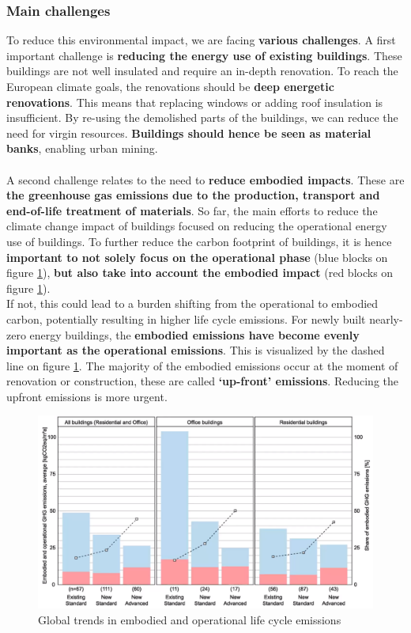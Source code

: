 \documentclass[../summary.tex]{subfiles}
\begin{document}
	\subsubsection{Main challenges}
	
	To reduce this environmental impact, we are facing \textbf{various challenges}. A first important challenge is \textbf{reducing the energy use of existing buildings}. These buildings are not well insulated and require an in-depth renovation. To reach the European climate goals, the renovations should be \textbf{deep energetic renovations}. This means that replacing windows or adding roof insulation is insufficient. By re-using the demolished parts of the buildings, we can reduce the need for virgin resources. \textbf{Buildings should hence be seen as material banks}, enabling urban mining.
	\\\\
	A second challenge relates to the need to \textbf{reduce embodied impacts}. These are \textbf{the greenhouse gas emissions due to the production, transport and end-of-life treatment of materials}. So far, the main efforts to reduce the climate change impact of buildings focused on reducing the operational energy use of buildings. To further reduce the carbon footprint of buildings, it is hence \textbf{important to not solely focus on the operational phase} (blue blocks on figure \ref{fig:8-embodied-operational-trends}), \textbf{but also take into account the embodied impact} (red blocks on figure \ref{fig:8-embodied-operational-trends}). \\
	If not, this could lead to a burden shifting from the operational to embodied carbon, potentially resulting in higher life cycle emissions. For newly built nearly-zero energy buildings, the \textbf{embodied emissions have become evenly important as the operational emissions}. This is visualized by the dashed line on figure \ref{fig:8-embodied-operational-trends}. The majority of the embodied emissions occur at the moment of renovation or construction, these are called \textbf{‘up-front’ emissions}. Reducing the upfront emissions is more urgent.
	
	\begin{figure}[H]
		\centering
		\includegraphics[width=0.6\linewidth]{../images/8-embodied-operational-trends}
		\caption{Global trends in embodied and operational life cycle emissions}
		\label{fig:8-embodied-operational-trends}
	\end{figure}
	
\end{document}
